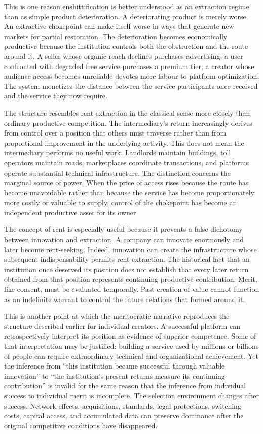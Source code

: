 \documentclass[11pt]{article}
\begin{document}
This is one reason enshittification is better understood as an extraction regime than as simple product deterioration. A deteriorating product is merely worse. An extractive chokepoint can make itself worse in ways that generate new markets for partial restoration. The deterioration becomes economically productive because the institution controls both the obstruction and the route around it. A seller whose organic reach declines purchases advertising; a user confronted with degraded free service purchases a premium tier; a creator whose audience access becomes unreliable devotes more labour to platform optimization. The system monetizes the distance between the service participants once received and the service they now require.

The structure resembles rent extraction in the classical sense more closely than ordinary productive competition. The intermediary's return increasingly derives from control over a position that others must traverse rather than from proportional improvement in the underlying activity. This does not mean the intermediary performs no useful work. Landlords maintain buildings, toll operators maintain roads, marketplaces coordinate transactions, and platforms operate substantial technical infrastructure. The distinction concerns the marginal source of power. When the price of access rises because the route has become unavoidable rather than because the service has become proportionately more costly or valuable to supply, control of the chokepoint has become an independent productive asset for its owner.

The concept of rent is especially useful because it prevents a false dichotomy between innovation and extraction. A company can innovate enormously and later become rent-seeking. Indeed, innovation can create the infrastructure whose subsequent indispensability permits rent extraction. The historical fact that an institution once deserved its position does not establish that every later return obtained from that position represents continuing productive contribution. Merit, like consent, must be evaluated temporally. Past creation of value cannot function as an indefinite warrant to control the future relations that formed around it.

This is another point at which the meritocratic narrative reproduces the structure described earlier for individual creators. A successful platform can retrospectively interpret its position as evidence of superior competence. Some of that interpretation may be justified: building a service used by millions or billions of people can require extraordinary technical and organizational achievement. Yet the inference from ``this institution became successful through valuable innovation'' to ``the institution's present returns measure its continuing contribution'' is invalid for the same reason that the inference from individual success to individual merit is incomplete. The selection environment changes after success. Network effects, acquisitions, standards, legal protections, switching costs, capital access, and accumulated data can preserve dominance after the original competitive conditions have disappeared.
\end{document}
